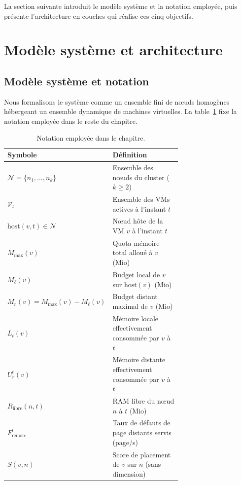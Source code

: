 La section suivante introduit le modèle système et la notation employée, puis présente l'architecture en couches qui réalise ces cinq objectifs.

\section{Modèle système et architecture}
\label{sec:architecture-generale}

\subsection{Modèle système et notation}
\label{subsec:modele-systeme}

Nous formalisons le système comme un ensemble fini de nœuds homogènes hébergeant un ensemble dynamique de machines virtuelles. La table~\ref{tab:notation} fixe la notation employée dans le reste du chapitre.

\begin{table}[htbp]
    \centering
    \caption{Notation employée dans le chapitre.}
    \label{tab:notation}
    \begin{tabular}{l p{0.70\linewidth}}
        \toprule
        \textbf{Symbole} & \textbf{Définition} \\
        \midrule
        $\mathcal{N} = \{n_1, \ldots, n_k\}$ & Ensemble des nœuds du cluster ($k \geq 2$) \\
        $\mathcal{V}_t$           & Ensemble des VMs actives à l'instant $t$ \\
        $\mathrm{host}(v, t) \in \mathcal{N}$ & Nœud hôte de la VM $v$ à l'instant $t$ \\
        $M_{\max}(v)$             & Quota mémoire total alloué à $v$ (Mio) \\
        $M_{\ell}(v)$             & Budget local de $v$ sur $\mathrm{host}(v)$ (Mio) \\
        $M_r(v) = M_{\max}(v) - M_{\ell}(v)$ & Budget distant maximal de $v$ (Mio) \\
        $L_t(v)$                  & Mémoire locale effectivement consommée par $v$ à $t$ \\
        $U_r^t(v)$                & Mémoire distante effectivement consommée par $v$ à $t$ \\
        $R_{\text{libre}}(n, t)$  & RAM libre du nœud $n$ à $t$ (Mio) \\
        $F_{\text{remote}}^t$     & Taux de défauts de page distants servis (page/s) \\
        $S(v, n)$                 & Score de placement de $v$ sur $n$ (sans dimension) \\
        \bottomrule
    \end{tabular}
\end{table}

